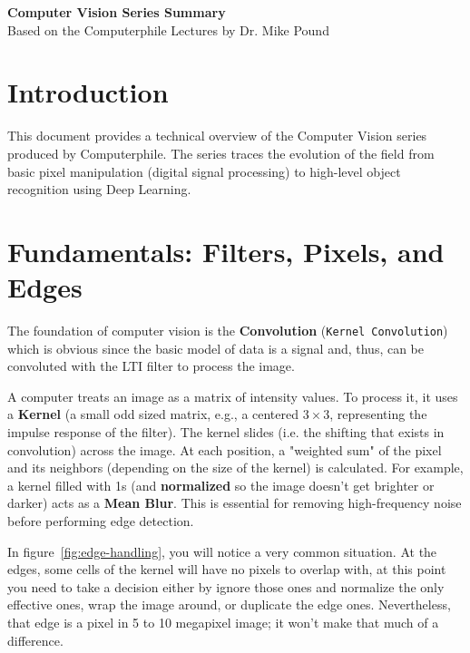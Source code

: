 \documentclass[11pt]{article}
\begin{document}
\begin{title}{\textbf{Computer Vision Series Summary}\\ \large Based on the Computerphile Lectures by Dr. Mike Pound}
\end{title}
\date{}

\maketitle
\newpage
\tableofcontents
\newpage
\section{Introduction}
This document provides a technical overview of the Computer Vision series produced by Computerphile. The series traces the evolution of the field from basic pixel manipulation (digital signal processing) to high-level object recognition using Deep Learning.

\newpage

\section{Fundamentals: Filters, Pixels, and Edges}

The foundation of computer vision is the \textbf{Convolution} (\texttt{Kernel Convolution}) which is obvious since the basic model of data is a signal and, thus, can be convoluted with the LTI filter to process the image. 

A computer treats an image as a matrix of intensity values. To process it, it uses a \textbf{Kernel} (a small odd sized matrix, e.g., a centered $3 \times 3$, representing the impulse response of the filter). The kernel slides (i.e. the shifting that exists in convolution) across the image. At each position, a "weighted sum" of the pixel and its neighbors (depending on the size of the kernel) is calculated. For example, a kernel filled with 1s (and \textbf{normalized} so the image doesn't get brighter or darker) acts as a \textbf{Mean Blur}. This is essential for removing high-frequency noise before performing edge detection. 

In figure~\ref{fig:edge-handling}, you will notice a very common situation. At the edges, some cells of the kernel will have no pixels to overlap with, at this point you need to take a decision either by ignore those ones and normalize the only effective ones, wrap the image around, or duplicate the edge ones. Nevertheless, that edge is a pixel in 5 to 10 megapixel image; it won't make that much of a difference.
\end{document}
